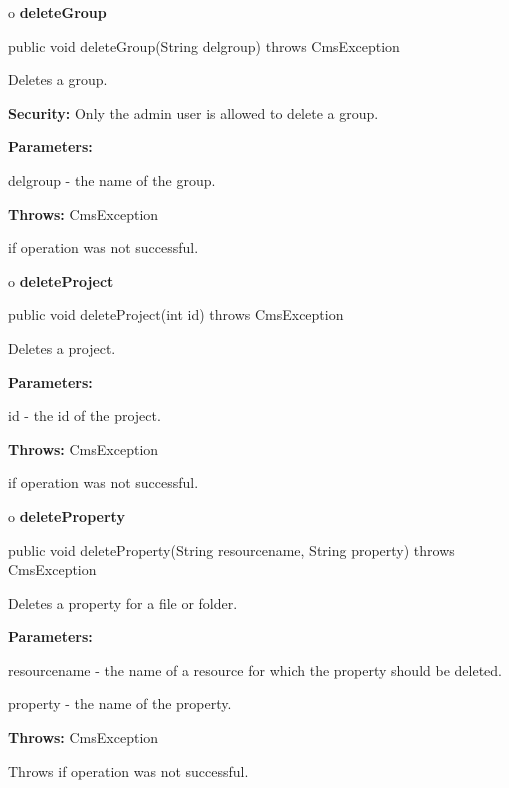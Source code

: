 o {\bf deleteGroup} 

\begin{PRE}
 public void deleteGroup(String delgroup) throws CmsException
\end{PRE}

\begin{description}
\htmlDD Deletes a group. 

{\bf Security:} Only the admin user is allowed to delete a group. 

\begin{description}
\item {\bf Parameters:}  

delgroup - the name of the group.  
\item {\bf Throws:} CmsException  

if operation was not successful.  
\end{description}

\end{description}

o {\bf deleteProject} 

\begin{PRE}
 public void deleteProject(int id) throws CmsException
\end{PRE}

\begin{description}
\htmlDD Deletes a project. 

\begin{description}
\item {\bf Parameters:}  

id - the id of the project.  
\item {\bf Throws:} CmsException  

if operation was not successful.  
\end{description}

\end{description}

o {\bf deleteProperty} 

\begin{PRE}
 public void deleteProperty(String resourcename,
                            String property) throws CmsException
\end{PRE}

\begin{description}
\htmlDD Deletes a property for a file or folder. 

\begin{description}
\item {\bf Parameters:}  

resourcename - the name of a resource for which the property should be
deleted.  

property - the name of the property.  
\item {\bf Throws:} CmsException  

Throws if operation was not successful.  
\end{description}

\end{description}

